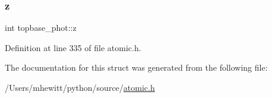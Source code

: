 \subsubsection{\texorpdfstring{z}{z}}
{\footnotesize\ttfamily int topbase\+\_\+phot\+::z}



Definition at line 335 of file atomic.\+h.



The documentation for this struct was generated from the following file\+:\begin{DoxyCompactItemize}
\item 
/\+Users/mhewitt/python/source/\hyperlink{atomic_8h}{atomic.\+h}\end{DoxyCompactItemize}
